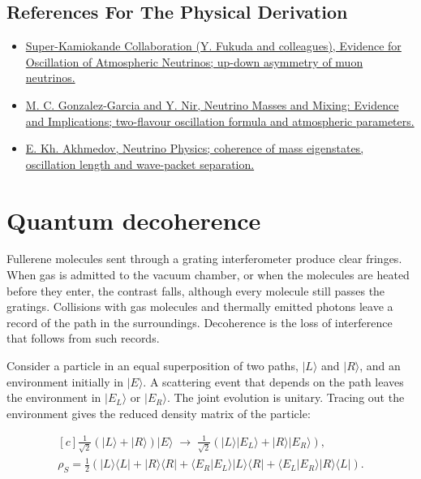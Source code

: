 \documentclass[11pt,oneside]{book}
\newenvironment{centeredalign}{\[\begin{gathered}[c]}{\end{gathered}\]}
\newcommand{\ket}[1]{\lvert #1\rangle}
\newcommand{\bra}[1]{\langle #1\rvert}
\begin{document}
\subsection*{References For The Physical Derivation}
\begin{itemize}
\item \href{https://arxiv.org/abs/hep-ex/9807003}{Super-Kamiokande Collaboration (Y. Fukuda and colleagues), Evidence for Oscillation of Atmospheric Neutrinos; up-down asymmetry of muon neutrinos.}
\item \href{https://arxiv.org/abs/hep-ph/0202058}{M. C. Gonzalez-Garcia and Y. Nir, Neutrino Masses and Mixing: Evidence and Implications; two-flavour oscillation formula and atmospheric parameters.}
\item \href{https://arxiv.org/abs/hep-ph/0001264}{E. Kh. Akhmedov, Neutrino Physics; coherence of mass eigenstates, oscillation length and wave-packet separation.}
\end{itemize}





\clearpage

\section{Quantum decoherence}

\label{topic:quantum-decoherence}

Fullerene molecules sent through a grating interferometer produce clear fringes. When gas is admitted to the vacuum chamber, or when the molecules are heated before they enter, the contrast falls, although every molecule still passes the gratings. Collisions with gas molecules and thermally emitted photons leave a record of the path in the surroundings. Decoherence is the loss of interference that follows from such records.

Consider a particle in an equal superposition of two paths, \(\ket L\) and \(\ket R\), and an environment initially in \(\ket E\). A scattering event that depends on the path leaves the environment in \(\ket{E_L}\) or \(\ket{E_R}\). The joint evolution is unitary. Tracing out the environment gives the reduced density matrix of the particle:

\begin{centeredalign}
\tfrac{1}{\sqrt2}(\ket L+\ket R)\ket E\;\longrightarrow\;
\tfrac{1}{\sqrt2}\left(\ket L\ket{E_L}+\ket R\ket{E_R}\right),\\
\rho_S=\tfrac12\left(\ket L\bra L+\ket R\bra R+\langle E_R|E_L\rangle\ket L\bra R
+\langle E_L|E_R\rangle\ket R\bra L\right).
\end{centeredalign}
\end{document}
